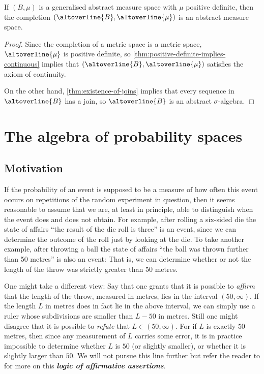 \documentclass[article, a4paper, 11pt, oneside]{memoir}
\numberwithin{equation}{chapter}
\renewcommand{\P}{\mathbb{P}}
\newcommand{\keyword}[1]{{\itshape\bfseries #1}}
\begin{document}
\begin{lemma}
    \label{thm:completion-gives-countable-additivity}
    If $(B,\mu)$ is a generalised abstract measure space with $\mu$ positive definite, then the completion $(\altoverline{B},\altoverline{\mu})$ is an abstract measure space.
\end{lemma}

\begin{proof}
    Since the completion of a metric space is a metric space, $\altoverline{\mu}$ is positive definite, so \cref{thm:positive-definite-implies-continuous} implies that $(\altoverline{B},\altoverline{\mu})$ satisfies the axiom of continuity.

    On the other hand, \cref{thm:existence-of-joins} implies that every sequence in $\altoverline{B}$ has a join, so $\altoverline{B}$ is an abstract $\sigma$-algebra.
\end{proof}



\chapter{The algebra of probability spaces}

\section{Motivation}

\newcommand{\compl}[1]{\altoverline{#1}}
\renewcommand{\P}{P}

If the probability of an event is supposed to be a measure of how often this event occurs on repetitions of the random experiment in question, then it seems reasonable to assume that we are, at least in principle, able to distinguish when the event does and does not obtain. For example, after rolling a six-sided die the state of affairs \enquote{the result of the die roll is three} is an event, since we can determine the outcome of the roll just by looking at the die. To take another example, after throwing a ball the state of affairs \enquote{the ball was thrown further than 50 metres} is also an event: That is, we can determine whether or not the length of the throw was strictly greater than 50 metres.

One might take a different view: Say that one grants that it is possible to \emph{affirm} that the length of the throw, measured in metres, lies in the interval $(50,\infty)$. If the length $L$ in metres does in fact lie in the above interval, we can simply use a ruler whose subdivisions are smaller than $L - 50$ in metres. Still one might disagree that it is possible to \emph{refute} that $L \in (50, \infty)$. For if $L$ is exactly $50$ metres, then since any measurement of $L$ carries some error, it is in practice impossible to determine whether $L$ is $50$ (or slightly smaller), or whether it is slightly larger than $50$. We will not pursue this line further but refer the reader to \textcite{vickers1989} for more on this \keyword{logic of affirmative assertions}.
\end{document}
